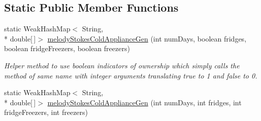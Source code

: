 \subsection*{Static Public Member Functions}
\begin{DoxyCompactItemize}
\item 
static Weak\-Hash\-Map$<$ String, \\*
double\mbox{[}$\,$\mbox{]}$>$ \hyperlink{classuk_1_1ac_1_1dmu_1_1iesd_1_1cascade_1_1util_1_1profilegenerators_1_1_melody_stokes_generator_a40f66106aba6d9ed791ccd81cf4025b9}{melody\-Stokes\-Cold\-Appliance\-Gen} (int num\-Days, boolean fridges, boolean fridge\-Freezers, boolean freezers)
\begin{DoxyCompactList}\small\item\em Helper method to use boolean indicators of ownership which simply calls the method of same name with integer arguments translating true to 1 and false to 0. \end{DoxyCompactList}\item 
\hypertarget{classuk_1_1ac_1_1dmu_1_1iesd_1_1cascade_1_1util_1_1profilegenerators_1_1_melody_stokes_generator_a1f9f2e1d0db34879d43508ab14de0bc7}{static Weak\-Hash\-Map$<$ String, \\*
double\mbox{[}$\,$\mbox{]}$>$ \hyperlink{classuk_1_1ac_1_1dmu_1_1iesd_1_1cascade_1_1util_1_1profilegenerators_1_1_melody_stokes_generator_a1f9f2e1d0db34879d43508ab14de0bc7}{melody\-Stokes\-Cold\-Appliance\-Gen} (int num\-Days, int fridges, int fridge\-Freezers, int freezers)}\label{classuk_1_1ac_1_1dmu_1_1iesd_1_1cascade_1_1util_1_1profilegenerators_1_1_melody_stokes_generator_a1f9f2e1d0db34879d43508ab14de0bc7}


\end{DoxyCompactItemize}
